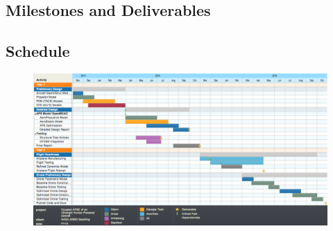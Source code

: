 \documentclass[]{aiaa-tc}
\begin{document}
\begin{landscape}
\section{Milestones and Deliverables}
    \subsection{Schedule}
        \begin{figure}
            \includegraphics[width=\hsize]{images/gantt_v2}
        \end{figure}
 \end{landscape}
\end{document}
